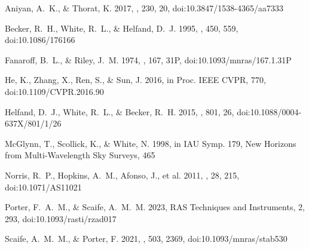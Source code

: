 \documentclass{aastex701}
\begin{document}
\begin{thebibliography}{}

 Aniyan, A.~K., \& Thorat, K. 2017, \apjs, 230,
20, doi:10.3847/1538-4365/aa7333

 Becker, R.~H., White, R.~L., \& Helfand, D.~J.
1995, \apj, 450, 559, doi:10.1086/176166

 Fanaroff, B.~L., \& Riley, J.~M. 1974,
\mnras, 167, 31P, doi:10.1093/mnras/167.1.31P

 He, K., Zhang, X., Ren, S., \& Sun, J. 2016, in Proc. IEEE
CVPR, 770, doi:10.1109/CVPR.2016.90

 Helfand, D.~J., White, R.~L., \& Becker, R.~H.
2015, \apj, 801, 26, doi:10.1088/0004-637X/801/1/26

 McGlynn, T., Scollick, K., \& White, N. 1998, in
IAU Symp. 179, New Horizons from Multi-Wavelength Sky Surveys, 465

 Norris, R.~P., Hopkins, A.~M., Afonso, J., et al.
2011, \pasa, 28, 215, doi:10.1071/AS11021

 Porter, F.~A.~M., \& Scaife, A.~M.~M. 2023,
RAS Techniques and Instruments, 2, 293, doi:10.1093/rasti/rzad017

 Scaife, A.~M.~M., \& Porter, F. 2021, \mnras,
503, 2369, doi:10.1093/mnras/stab530

\end{thebibliography}
\end{document}
